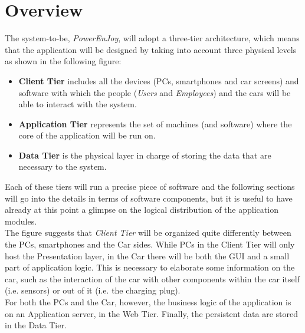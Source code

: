 \documentclass[11pt,a4paper]{report}
\begin{document}
\section{Overview}
The system-to-be, \textit{PowerEnJoy}, will adopt a three-tier architecture, which means that the application will be designed by taking into account three physical levels as shown in the following figure:
\begin{itemize}
\item \textbf{Client Tier} includes all the devices (PCs, smartphones and car screens) and software with which the people (\textit{Users} and \textit{Employees}) and the cars will be able to interact with the 			system.
\item \textbf{Application Tier} represents the set of machines (and 				software) where the core of the application will be run on.
\item \textbf{Data Tier} is the physical layer in charge of storing the data that are necessary to the system.
\end{itemize}
\noindent Each of these tiers will run a precise piece of software and the following sections will go into the details in terms of software components, but it is useful to have already at this point a glimpse on the logical distribution of the application modules.\\
\noindent The figure suggests that \textit{Client Tier} will be organized quite differently between the PCs, smartphones and the Car sides. While PCs in the Client Tier will only host the Presentation layer, in the Car there will be both the GUI and a small part of application logic. This is necessary to elaborate some information on the car, such as the interaction of the car with other components within the car itself (i.e. sensors) or out of it (i.e. the charging plug).\\
For both the PCs and the Car, however, the business logic of the application is on an Application server, in the Web Tier. Finally, the persistent data are stored in the Data Tier.
\end{document}
